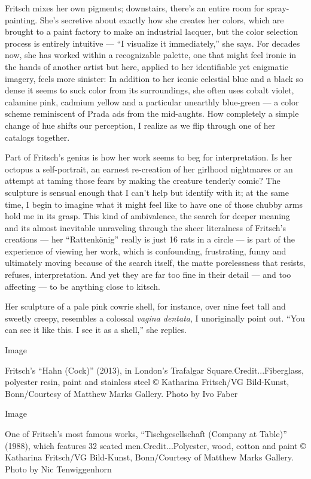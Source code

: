 Fritsch mixes her own pigments; downstairs, there's an entire room for
spray-painting. She's secretive about exactly how she creates her
colors, which are brought to a paint factory to make an industrial
lacquer, but the color selection process is entirely intuitive --- ``I
visualize it immediately,'' she says. For decades now, she has worked
within a recognizable palette, one that might feel ironic in the hands
of another artist but here, applied to her identifiable yet enigmatic
imagery, feels more sinister: In addition to her iconic celestial blue
and a black so dense it seems to suck color from its surroundings, she
often uses cobalt violet, calamine pink, cadmium yellow and a particular
unearthly blue-green --- a color scheme reminiscent of Prada ads from
the mid-aughts. How completely a simple change of hue shifts our
perception, I realize as we flip through one of her catalogs together.

Part of Fritsch's genius is how her work seems to beg for
interpretation. Is her octopus a self-portrait, an earnest re-creation
of her girlhood nightmares or an attempt at taming those fears by making
the creature tenderly comic? The sculpture is sensual enough that I
can't help but identify with it; at the same time, I begin to imagine
what it might feel like to have one of those chubby arms hold me in its
grasp. This kind of ambivalence, the search for deeper meaning and its
almost inevitable unraveling through the sheer literalness of Fritsch's
creations --- her ``Rattenkönig'' really is just 16 rats in a circle ---
is part of the experience of viewing her work, which is confounding,
frustrating, funny and ultimately moving because of the search itself,
the matte porelessness that resists, refuses, interpretation. And yet
they are far too fine in their detail --- and too affecting --- to be
anything close to kitsch.

Her sculpture of a pale pink cowrie shell, for instance, over nine feet
tall and sweetly creepy, resembles a colossal \emph{vagina dentata}, I
unoriginally point out. ``You can see it like this. I see it as a
shell,'' she replies.

Image

Fritsch's ``Hahn (Cock)'' (2013), in London's Trafalgar
Square.Credit...Fiberglass, polyester resin, paint and stainless steel ©
Katharina Fritsch/VG Bild-Kunst, Bonn/Courtesy of Matthew Marks Gallery.
Photo by Ivo Faber

Image

One of Fritsch's most famous works, ``Tischgesellschaft (Company at
Table)'' (1988), which features 32 seated men.Credit...Polyester, wood,
cotton and paint © Katharina Fritsch/VG Bild-Kunst, Bonn/Courtesy of
Matthew Marks Gallery. Photo by Nic Tenwiggenhorn


